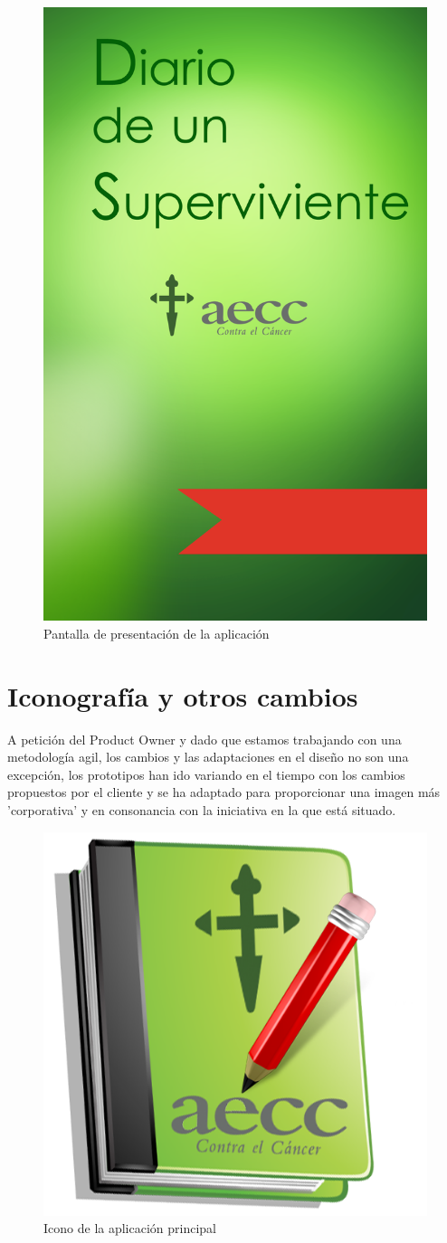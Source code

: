 \documentclass[../pfc.tex]{subfiles}
\begin{document}
		\begin{figure}[H]
			\centering
			\includegraphics[width=0.3\linewidth]{../images/flasher_pantalla_carga}
			\caption{Pantalla de presentación de la aplicación}
			\label{fig:flasher_pantalla_carga}
		\end{figure}
		
		
	
	\section{Iconografía y otros cambios}
	
	A petición del Product Owner y dado que estamos trabajando con una metodología agil, los cambios y las adaptaciones en el diseño no son una excepción, los prototipos han ido variando en el tiempo con los cambios propuestos por el cliente y se ha adaptado para proporcionar una imagen más 'corporativa' y en consonancia con la iniciativa en la que está situado.
	
		\begin{figure}[H]
			\centering
			\includegraphics[width=0.5\linewidth]{../images/icon_aecc}
			\caption{Icono de la aplicación principal}
			\label{fig:icono}
		\end{figure}
	
\end{document}
